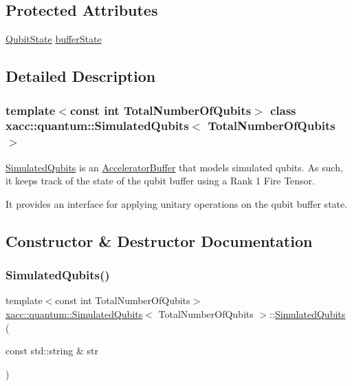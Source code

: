 \subsection*{Protected Attributes}
\begin{DoxyCompactItemize}
\item 
\hyperlink{a01812}{Qubit\+State} \hyperlink{a01248_ade9f334823890b3c0553800188ac3ef9}{buffer\+State}
\end{DoxyCompactItemize}


\subsection{Detailed Description}
\subsubsection*{template$<$const int Total\+Number\+Of\+Qubits$>$\newline
class xacc\+::quantum\+::\+Simulated\+Qubits$<$ Total\+Number\+Of\+Qubits $>$}

\hyperlink{a01248}{Simulated\+Qubits} is an \hyperlink{a02444}{Accelerator\+Buffer} that models simulated qubits. As such, it keeps track of the state of the qubit buffer using a Rank 1 Fire Tensor.

It provides an interface for applying unitary operations on the qubit buffer state. 

\subsection{Constructor \& Destructor Documentation}
\mbox{\label{a01248_afeb610fbd0c761caa15136e77260ba48}} 
\subsubsection{\texorpdfstring{Simulated\+Qubits()}{SimulatedQubits()}\hspace{0.1cm}{\footnotesize\ttfamily [1/2]}}
{\footnotesize\ttfamily template$<$const int Total\+Number\+Of\+Qubits$>$ \\
\hyperlink{a01248}{xacc\+::quantum\+::\+Simulated\+Qubits}$<$ Total\+Number\+Of\+Qubits $>$\+::\hyperlink{a01248}{Simulated\+Qubits} (\begin{DoxyParamCaption}\item[{const std\+::string \&}]{str }\end{DoxyParamCaption})\hspace{0.3cm}{\ttfamily [inline]}}

